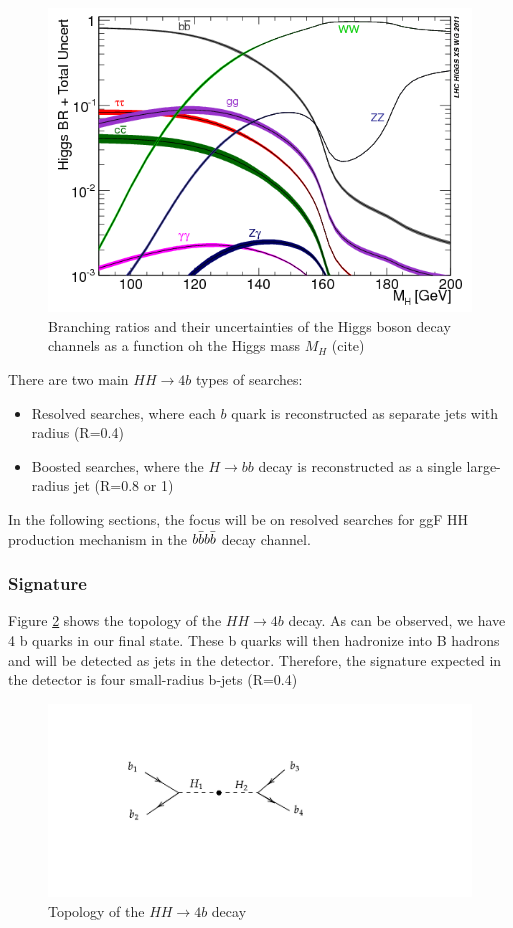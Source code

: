 \begin{figure}[hbt]
    \centering
    \includegraphics[width=0.7\linewidth]{Images/4.HH4b Analysis/Higgs intro/BR_higgs.png}
    \caption{Branching ratios and their uncertainties of the Higgs boson decay channels as a function oh the Higgs mass $M_H$ (cite)}
    \label{fig: BR Higgs}
\end{figure}

There are two main $HH \to 4b$ types of searches:
\begin{itemize}
    \item Resolved searches, where each $b$ quark is reconstructed as separate jets with radius (R=0.4)
    \item Boosted searches, where the $H\to bb$ decay is reconstructed as a single large-radius jet (R=0.8 or 1)
\end{itemize}

In the following sections, the focus will be on resolved searches for ggF HH production mechanism in the $b\Bar{b}b\Bar{b}$ decay channel.

\newpage

\subsubsection{Signature}
Figure \ref{fig: topology} shows the topology of the $HH\to 4b $ decay. As can be observed, we have 4 b quarks in our final state. These b quarks will then hadronize into B hadrons and will be detected as jets in the detector. Therefore, the signature expected in the detector is four small-radius b-jets (R=0.4)
\begin{figure}[hbt]
    \centering
    \includegraphics[width=0.5\linewidth]{Images/4.HH4b Analysis/Higgs intro/topology di-higgs.pdf}
    \caption{Topology of the $HH \to 4b$ decay}
    \label{fig: topology}
\end{figure}

